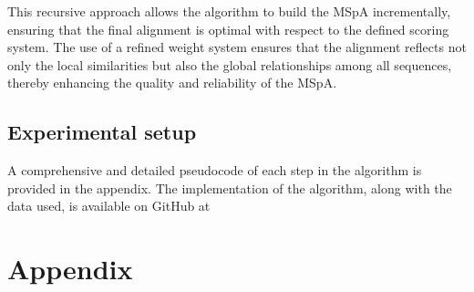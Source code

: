 \documentclass[12pt,oneside,letterpaper,english]{article}
\begin{document}
This recursive approach allows the algorithm to build the MSpA incrementally, ensuring that the final 
alignment is optimal with respect to the defined scoring system. The use of a refined weight system 
ensures that the alignment reflects not only the local similarities but also the global relationships 
among all sequences, thereby enhancing the quality and reliability of the MSpA.



\subsection{Experimental setup}
A comprehensive and detailed pseudocode of each step in the algorithm is provided in the appendix. 
The implementation of the algorithm, along with the data used, is available on GitHub at

\label{EndOfText}

\newpage
{} 
\listoffigures
\thispagestyle{fancy}

\newpage
{}
\listoftables
\thispagestyle{fancy}

\newpage
{}
%  

% 

\newpage
\section{Appendix} \label{ch6}

\label{endOfDoc}
\end{document}
